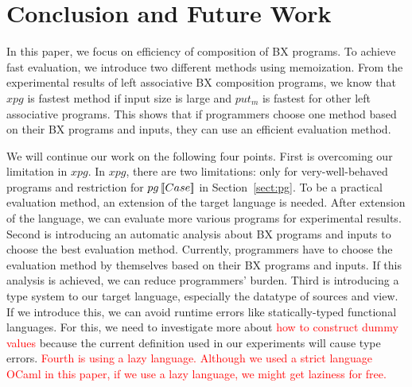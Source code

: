 \section{Conclusion and Future Work} \label{sect:conclusion}

In this paper, we focus on efficiency of composition of BX programs.
To achieve fast evaluation, we introduce two different methods using memoization.
From the experimental results of left associative BX composition programs, we know that $xpg$ is fastest method if input size is large and
$put_m$ is fastest for other left associative programs.
This shows that if programmers choose one method based on their BX programs and inputs, they can use an efficient evaluation method. 


We will continue our work on the following four points.
First is overcoming our limitation in $xpg$. In $xpg$, there are two limitations: only for very-well-behaved programs and restriction for $pg \, [\![Case]\!]$ in Section~\ref{sect:pg}. To be a practical evaluation method, an extension of the target language is needed. After extension of the language, we can evaluate more various programs for experimental results.
Second is introducing an automatic analysis about BX programs and inputs to choose the best evaluation method.
Currently, programmers have to choose the evaluation method by themselves based on their BX programs and inputs. If this analysis is achieved, we can reduce programmers' burden.
Third is introducing a type system to our target language, especially the datatype of sources and view. If we introduce this, we can avoid runtime errors like statically-typed functional languages. For this, we need to investigate more about \textcolor{red}{how to construct dummy values} because the current definition used in our experiments %
will cause type errors.
\textcolor{red}{Fourth is using a lazy language. Although we used a strict language OCaml in this paper, if we use a lazy language, we might get laziness for free.}






